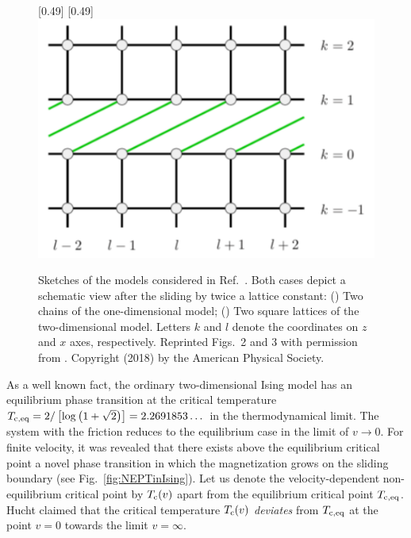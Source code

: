\begin{figure}[htbp]
	\centering
	\subcaptionbox{\label{subcap:one-dim}}[0.49\linewidth]{}
	\subcaptionbox{\label{subcap:two-dim}}[0.49\linewidth]{\includegraphics[width=0.35\linewidth]{Fig3Modified.pdf}}
	\caption{Sketches of the models considered in Ref.~\cite{Hucht2009b}. Both cases depict a schematic view after the sliding by twice a lattice constant: () Two chains of the one-dimensional model; () Two square lattices of the two-dimensional model. Letters $k$ and $l$ denote the coordinates on $z$ and $x$ axes, respectively. Reprinted Figs.~2 and 3 with permission from . Copyright (2018) by the American Physical Society.}
	\label{fig:SketchNEIsing}
\end{figure}

As a well known fact, the ordinary two-dimensional Ising model has an equilibrium phase transition at the critical temperature $T_{\rm c,eq}=2/\left[\log\left(1+\sqrt{2}\right)\right]=2.2691853\dots$ in the thermodynamical limit. The system with the friction reduces to the equilibrium case in the limit of $v\to 0$. For finite velocity, it was revealed \cite{Kadau2008,Hucht2009b} that there exists above the equilibrium critical point a novel phase transition in which the magnetization grows on the sliding boundary (see Fig.~\ref{fig:NEPTinIsing}). Let us denote the velocity-dependent non-equilibrium critical point by $T_{\rm c}(v)$ apart from the equilibrium critical point $T_{\rm c, eq}$. Hucht \cite{Hucht2009b} claimed that the critical temperature $T_{\rm c}(v)$ \textit{deviates} from $T_{\rm c,eq}$ at the point $v=0$ towards the limit $v=\infty$.

